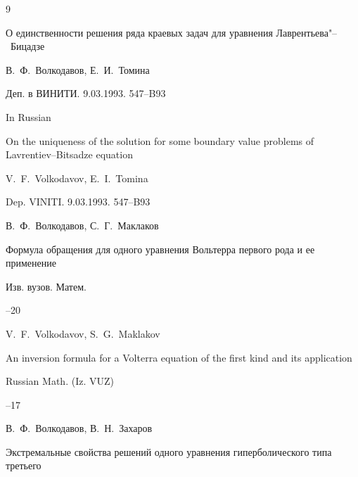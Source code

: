 \begin{thebibliography}{9}




\preprint О единственности решения ряда краевых задач для уравнения Лаврентьева"--~Бицадзе

\by В.~Ф.~Волкодавов, Е.~И.~Томина

\preprintinfo Деп. в ВИНИТИ. 9.03.1993. 547–B93


\misctransl

\lang In Russian

\preprint On the uniqueness of the solution for some boundary value problems of Lavrentiev--Bitsadze equation

\by V.~F.~Volkodavov, E.~I.~Tomina

\preprintinfo Dep. VINITI. 9.03.1993. 547–B93





\by В.~Ф.~Волкодавов, С.~Г.~Маклаков

\paper Формула обращения для одного уравнения Вольтерра первого рода и ее применение

\jour Изв. вузов. Матем.



--20




\transl

\by V.~F.~Volkodavov, S.~G.~Maklakov

\paper An inversion formula for a Volterra equation of the first kind and its application

\jour Russian Math. (Iz. VUZ)




--17




\by В.~Ф.~Волкодавов, В.~Н.~Захаров

\paper Экстремальные свойства решений одного уравнения гиперболического типа третьего 


\end{thebibliography}

